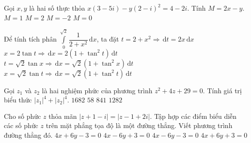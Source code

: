 \begin{ex}%
	Gọi $x,y$ là hai số thực thỏa $x(3-5i)-y(2-i)^2=4-2i$. Tính $M=2x-y$.
	\choice
	{$M=1$}
	{$M=2$}
	{\True $M=-2$}
	{$M=0$}
	
\end{ex}

\begin{ex}%
	Để tính tích phân $\displaystyle\int\limits_{0}^{\sqrt{2}}\dfrac{1}{2+x^2}\mathrm{\,d}x$, ta đặt
	\choice
	{$t=2+x^2\Rightarrow \mathrm{\,d}t=2x\mathrm{\,d}x$}
	{$x=2\tan t\Rightarrow \mathrm{\,d}x=2(1+\tan^2t)\mathrm{\,d}t$}
	{$t=\sqrt{2}\tan x\Rightarrow \mathrm{\,d}x=\sqrt{2}(1+\tan^2x)\mathrm{\,d}t$}
	{\True $x=\sqrt{2}\tan t\Rightarrow \mathrm{\,d}x=\sqrt{2}(1+\tan^2t)\mathrm{\,d}t$}
\end{ex}

\begin{ex}%
	Gọi $z_1$ và $z_2$ là hai nghiệm phức của phương trình $z^2+4z+29=0$. Tính giá trị biểu thức $|z_1|^4+|z_2|^4$.
	\choice
	{\True $1682$}
	{$58$}
	{$841$}
	{$1282$}
\end{ex}

\begin{ex}%
	Cho số phức $z$ thỏa mãn $|z+1-i|=|z-1+2i|$. Tập hợp các điểm biểu diễn các số phức $z$ trên mặt phẳng tọa độ là một đường thẳng. Viết phương trình đường thẳng đó.
	\choice
	{$4x+6y-3=0$}
	{$4x-6y+3=0$}
	{\True $4x-6y-3=0$}
	{$4x+6y+3=0$}
\end{ex}

